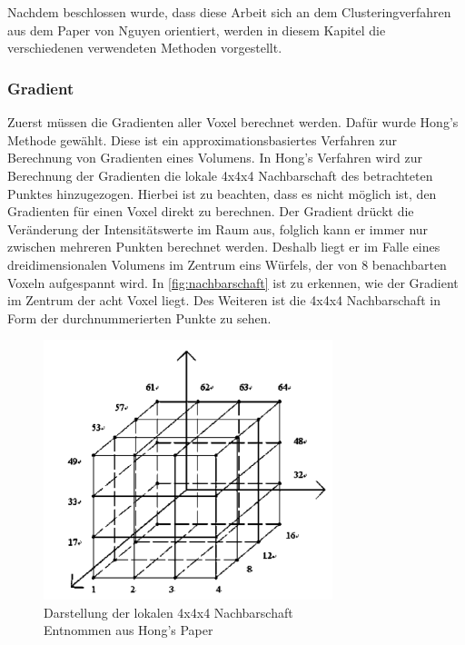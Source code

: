 \chapter{}
\label{sec:methods}

Nachdem beschlossen wurde, dass diese Arbeit sich an dem Clusteringverfahren aus dem Paper von Nguyen \cite{nguyen2012clustering} orientiert, werden in diesem Kapitel die verschiedenen verwendeten Methoden vorgestellt.

\subsection{Gradient}

Zuerst müssen die Gradienten aller Voxel berechnet werden. Dafür wurde Hong's Methode \cite{hong2003method} gewählt. Diese ist ein approximationsbasiertes Verfahren zur Berechnung von Gradienten eines Volumens. 
\newline
In Hong's Verfahren wird zur Berechnung der Gradienten die lokale 4x4x4 Nachbarschaft des betrachteten Punktes hinzugezogen.
\newline
Hierbei ist zu beachten, dass es nicht möglich ist, den Gradienten für einen Voxel direkt zu berechnen. Der Gradient drückt die Veränderung der Intensitätswerte im Raum aus, folglich kann er immer nur zwischen mehreren Punkten berechnet werden. Deshalb liegt er im Falle eines dreidimensionalen Volumens im Zentrum eins Würfels, der von 8 benachbarten Voxeln aufgespannt wird.
\newline
In \autoref{fig:nachbarschaft} ist zu erkennen, wie der Gradient im Zentrum der acht Voxel liegt. Des Weiteren ist die 4x4x4 Nachbarschaft in Form der durchnummerierten Punkte zu sehen.
\newline

\begin{figure}[!h] 
\centering 
\includegraphics[width=0.75\textwidth]{Logos/VoxelEdges.PNG}
\caption{Darstellung der lokalen 4x4x4 Nachbarschaft  \\ Entnommen aus Hong's Paper} 
\label{fig:nachbarschaft} 
\end{figure}


